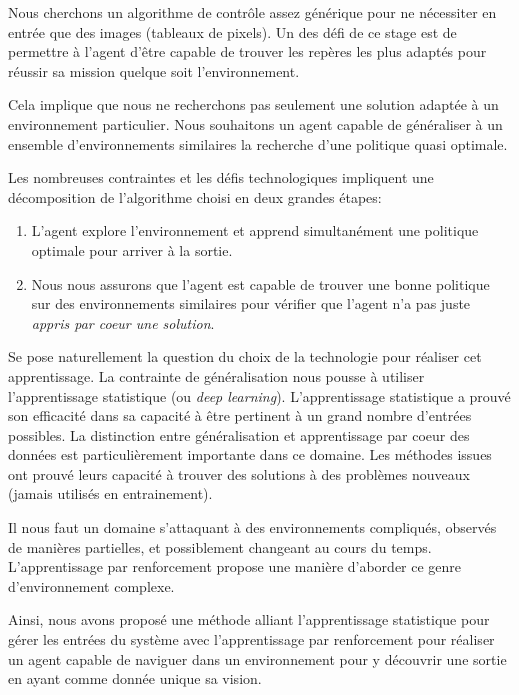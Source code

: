 Nous cherchons un algorithme de contrôle assez générique pour ne nécessiter en entrée que des images (tableaux de pixels). Un des défi de ce stage est de permettre à  l'agent d'être capable de trouver les repères les plus adaptés pour réussir sa mission quelque soit l'environnement.

Cela implique que nous ne recherchons pas seulement une solution adaptée à un environnement particulier. Nous souhaitons un agent capable de généraliser à un ensemble d'environnements similaires la recherche d'une politique quasi optimale. 

Les nombreuses contraintes et les défis technologiques impliquent une décomposition de l'algorithme choisi en deux grandes étapes:

\begin{enumerate}
    \item L'agent explore l'environnement et apprend simultanément une politique optimale pour arriver à la sortie.
    \item Nous nous assurons que l'agent est capable de trouver une bonne politique sur des environnements similaires pour vérifier que l'agent n'a pas juste \emph{appris par coeur une solution}.
\end{enumerate}

Se pose naturellement la question du choix de la technologie pour réaliser cet apprentissage.
La contrainte de généralisation nous pousse à utiliser l'apprentissage statistique (ou \emph{deep learning}). L'apprentissage statistique a prouvé son efficacité dans sa capacité à être pertinent à un grand nombre d'entrées possibles.  
La distinction entre généralisation et apprentissage par coeur des données est particulièrement importante dans ce domaine. Les méthodes issues ont prouvé leurs capacité à trouver des solutions à des problèmes nouveaux (jamais utilisés en entrainement).

Il nous faut un domaine s'attaquant à des environnements compliqués, observés de manières partielles, et possiblement changeant au cours du temps. L'apprentissage par renforcement propose une manière d'aborder ce genre d'environnement complexe. 

Ainsi, nous avons proposé une méthode alliant l'apprentissage statistique pour gérer les entrées du système avec l'apprentissage par renforcement pour réaliser un agent capable de naviguer dans un environnement pour y découvrir une sortie en ayant comme donnée unique sa vision.
